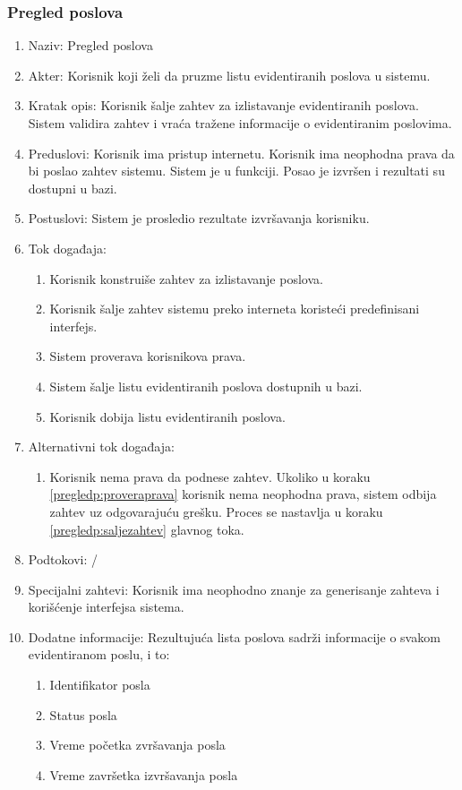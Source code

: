 \documentclass[12pt,oneside]{memoir}
\begin{document}
\subsubsection{Pregled poslova}
\begin{enumerate}
\item Naziv: Pregled poslova
\item Akter: Korisnik koji želi da pruzme listu evidentiranih poslova u sistemu.
\item Kratak opis: Korisnik šalje zahtev za izlistavanje evidentiranih poslova. Sistem validira zahtev i vraća tražene informacije o evidentiranim poslovima.
\item Preduslovi: Korisnik ima pristup internetu. Korisnik ima neophodna prava da bi poslao zahtev sistemu. Sistem je u funkciji. Posao je izvršen i rezultati su dostupni u bazi.
\item Postuslovi: Sistem je prosledio rezultate izvršavanja korisniku.
\item Tok događaja:
	\begin{enumerate}
	\item \label{pregledp:konstruisezahtev} Korisnik konstruiše zahtev za izlistavanje poslova.
	\item \label{pregledp:saljezahtev} Korisnik šalje zahtev sistemu preko interneta koristeći predefinisani interfejs.
	\item \label{pregledp:proveraprava} Sistem proverava korisnikova prava.
	\item \label{pregledp:slanjeliste} Sistem šalje listu evidentiranih poslova dostupnih u bazi.
	\item Korisnik dobija listu evidentiranih poslova.
	\end{enumerate}
\item Alternativni tok događaja:
	\begin{enumerate}
	\item Korisnik nema prava da podnese zahtev. Ukoliko u koraku \ref{pregledp:proveraprava} korisnik nema neophodna prava, sistem odbija zahtev uz odgovarajuću grešku. Proces se nastavlja u koraku \ref{pregledp:saljezahtev} glavnog toka.
	\end{enumerate}
\item Podtokovi: /
\item Specijalni zahtevi: Korisnik ima neophodno znanje za generisanje zahteva i korišćenje interfejsa sistema.
\item Dodatne informacije: Rezultujuća lista poslova sadrži informacije o svakom evidentiranom poslu, i to:
	\begin{enumerate}
	\item Identifikator posla
	\item Status posla
	\item Vreme početka zvršavanja posla
	\item Vreme završetka izvršavanja posla
	\end{enumerate}
\end{enumerate}
\end{document}
